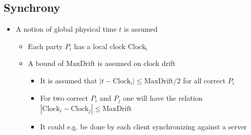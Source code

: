 \documentclass[11pt]{article}
\begin{document}
\subsection{Synchrony}
\label{sec:org79927d7}
\begin{itemize}
\item A notion of global physical time \(t\) is assumed
\begin{itemize}
\item Each party \(P_i\) has a local clock \(\text{Clock}_i\)
\item A bound of \(\text{MaxDrift}\) is assumed on clock drift
\begin{itemize}
\item It is assumed that \(|t-\text{Clock}_i| \leq \text{MaxDrift}/2\) for all correct \(P_i\)
\item For two correct \(P_i\) and \(P_j\) one will have the relation \(|\text{Clock}_i - \text{Clock}_j | \leq \text{MaxDrift}\)
\item It could e.g. be done by each client synchronizing against a server
\end{itemize}
\end{itemize}
\end{itemize}
\end{document}
